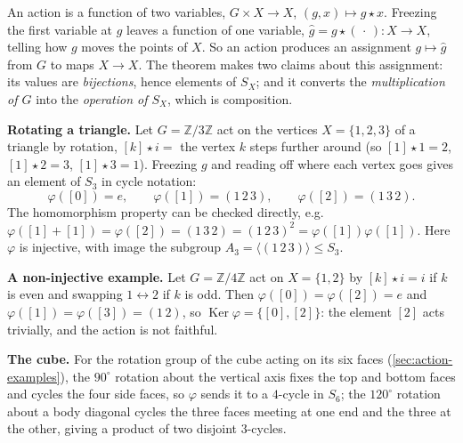 \documentclass[11pt]{report}
\begin{document}
\begin{rembox}\label{rem:function-two-variables-function-one}
An action is a function of two variables, $G \times X \to X$, $(g, x) \mapsto g \star x$. Freezing the first variable at $g$ leaves a function of one variable, $\hat g = g \star (\,\cdot\,): X \to X$, telling how $g$ moves the points of $X$. So an action produces an assignment $g \mapsto \hat g$ from $G$ to maps $X \to X$. The theorem makes two claims about this assignment: its values are \emph{bijections}, hence elements of $S_X$; and it converts the \emph{multiplication of $G$} into the \emph{operation of $S_X$}, which is composition.
\end{rembox}

\begin{exbox}\label{ex:seeing-permutations}
\textbf{Rotating a triangle.} Let $G = \mathbb{Z}/3\mathbb{Z}$ act on the vertices $X = \{1, 2, 3\}$ of a triangle by rotation, $[k] \star i = $ the vertex $k$ steps further around (so $[1] \star 1 = 2$, $[1] \star 2 = 3$, $[1] \star 3 = 1$). Freezing $g$ and reading off where each vertex goes gives an element of $S_3$ in cycle notation:
\[ \varphi([0]) = e, \qquad \varphi([1]) = (1\,2\,3), \qquad \varphi([2]) = (1\,3\,2). \]
The homomorphism property can be checked directly, e.g.\ $\varphi([1] + [1]) = \varphi([2]) = (1\,3\,2) = (1\,2\,3)^2 = \varphi([1])\varphi([1])$. Here $\varphi$ is injective, with image the subgroup $A_3 = \langle (1\,2\,3) \rangle \leq S_3$.

\textbf{A non-injective example.} Let $G = \mathbb{Z}/4\mathbb{Z}$ act on $X = \{1, 2\}$ by $[k] \star i = i$ if $k$ is even and swapping $1 \leftrightarrow 2$ if $k$ is odd. Then $\varphi([0]) = \varphi([2]) = e$ and $\varphi([1]) = \varphi([3]) = (1\,2)$, so $\operatorname{Ker}\varphi = \{[0], [2]\}$: the element $[2]$ acts trivially, and the action is not faithful.

\textbf{The cube.} For the rotation group of the cube acting on its six faces (\ref{sec:action-examples}), the $90^\circ$ rotation about the vertical axis fixes the top and bottom faces and cycles the four side faces, so $\varphi$ sends it to a $4$-cycle in $S_6$; the $120^\circ$ rotation about a body diagonal cycles the three faces meeting at one end and the three at the other, giving a product of two disjoint $3$-cycles.
\end{exbox}
\end{document}
